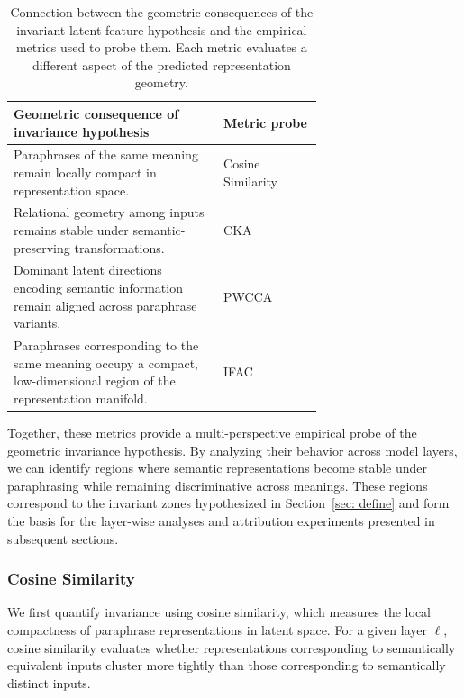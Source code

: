 \begin{table}[ht]
\centering
\vspace{-0.5em}
\begin{tabularx}{0.95\linewidth}{p{0.68\linewidth} X}
\toprule
\textbf{Geometric consequence of invariance hypothesis} & \textbf{Metric probe} \\
\midrule
Paraphrases of the same meaning remain locally compact in representation space. 
& Cosine Similarity \\

Relational geometry among inputs remains stable under semantic-preserving transformations. 
& CKA \\

Dominant latent directions encoding semantic information remain aligned across paraphrase variants. 
& PWCCA \\

Paraphrases corresponding to the same meaning occupy a compact, low-dimensional region of the representation manifold. 
& IFAC \\
\bottomrule
\end{tabularx}
\vspace{0.5em}
\caption{Connection between the geometric consequences of the invariant latent feature hypothesis and the empirical metrics used to probe them. Each metric evaluates a different aspect of the predicted representation geometry.}
\label{tab:metrics_summary}
\vspace{-1.2em}
\end{table}

Together, these metrics provide a multi-perspective empirical probe of the geometric invariance hypothesis. By analyzing their behavior across model layers, we can identify regions where semantic representations become stable under paraphrasing while remaining discriminative across meanings. These regions correspond to the invariant zones hypothesized in Section~\ref{sec: define} and form the basis for the layer-wise analyses and attribution experiments presented in subsequent sections.

\subsubsection{Cosine Similarity}

We first quantify invariance using cosine similarity, which measures the local compactness of paraphrase representations in latent space. For a given layer $\ell$, cosine similarity evaluates whether representations corresponding to semantically equivalent inputs cluster more tightly than those corresponding to semantically distinct inputs.

